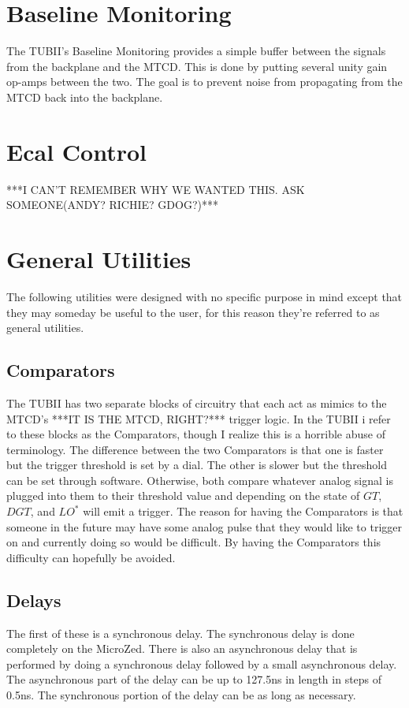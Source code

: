 \documentclass[11pt,a4paper]{article}
\begin{document}
\section{Baseline Monitoring}
The TUBII's Baseline Monitoring provides a simple buffer between the signals from the backplane and the MTCD. This is done by putting several unity gain op-amps between the two. The goal is to prevent noise from propagating from the MTCD back into the backplane. 
\section{Ecal Control}
***I CAN'T REMEMBER WHY WE WANTED THIS. ASK SOMEONE(ANDY? RICHIE? GDOG?)***
\section{General Utilities}

The following utilities were designed with no specific purpose in mind except that they may someday be useful to the user, for this reason they're referred to as general utilities.
\subsection{Comparators}
The TUBII has two separate blocks of circuitry that each act as mimics to the MTCD's ***IT IS THE MTCD, RIGHT?*** trigger logic. In the TUBII i refer to these blocks as the Comparators, though I realize this is a horrible abuse of terminology. The difference between the two Comparators is that one is faster but the trigger threshold is set by a dial. The other is slower but the threshold can be set through software. Otherwise, both compare whatever analog signal is plugged into them to their threshold value and depending on the state of $GT$, $DGT$, and $LO^*$ will emit a trigger. The reason for having the Comparators is that someone in the future may have some analog pulse that they would like to trigger on and currently doing so would be difficult. By having the Comparators this difficulty can hopefully be avoided.
\subsection{Delays}
The first of these is a synchronous delay. The synchronous delay is done completely on the MicroZed.  There is also an asynchronous delay that is performed by doing a synchronous delay followed by a small asynchronous delay. The asynchronous part of the delay can be up to 127.5ns in length in steps of 0.5ns. The synchronous portion of the delay can be as long as necessary.
\end{document}
